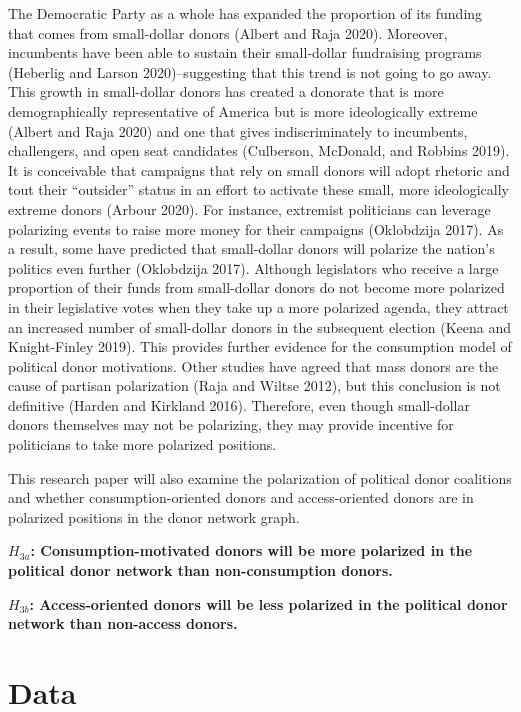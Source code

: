 \documentclass[12pt,]{article}
\begin{document}
The Democratic Party as a whole has expanded the proportion of its
funding that comes from small-dollar donors (Albert and Raja 2020).
Moreover, incumbents have been able to sustain their small-dollar
fundraising programs (Heberlig and Larson 2020)--suggesting that this
trend is not going to go away. This growth in small-dollar donors has
created a donorate that is more demographically representative of
America but is more ideologically extreme (Albert and Raja 2020) and one
that gives indiscriminately to incumbents, challengers, and open seat
candidates (Culberson, McDonald, and Robbins 2019). It is conceivable
that campaigns that rely on small donors will adopt rhetoric and tout
their ``outsider'' status in an effort to activate these small, more
ideologically extreme donors (Arbour 2020). For instance, extremist
politicians can leverage polarizing events to raise more money for their
campaigns (Oklobdzija 2017). As a result, some have predicted that
small-dollar donors will polarize the nation's politics even further
(Oklobdzija 2017). Although legislators who receive a large proportion
of their funds from small-dollar donors do not become more polarized in
their legislative votes when they take up a more polarized agenda, they
attract an increased number of small-dollar donors in the subsequent
election (Keena and Knight-Finley 2019). This provides further evidence
for the consumption model of political donor motivations. Other studies
have agreed that mass donors are the cause of partisan polarization
(Raja and Wiltse 2012), but this conclusion is not definitive (Harden
and Kirkland 2016). Therefore, even though small-dollar donors
themselves may not be polarizing, they may provide incentive for
politicians to take more polarized positions.

This research paper will also examine the polarization of political
donor coalitions and whether consumption-oriented donors and
access-oriented donors are in polarized positions in the donor network
graph.

\textbf{\(H_{3a}\): Consumption-motivated donors will be more polarized
in the political donor network than non-consumption donors.}

\textbf{\(H_{3b}\): Access-oriented donors will be less polarized in the
political donor network than non-access donors.}

\hypertarget{data}{%
\section{Data}\label{data}}
\end{document}
